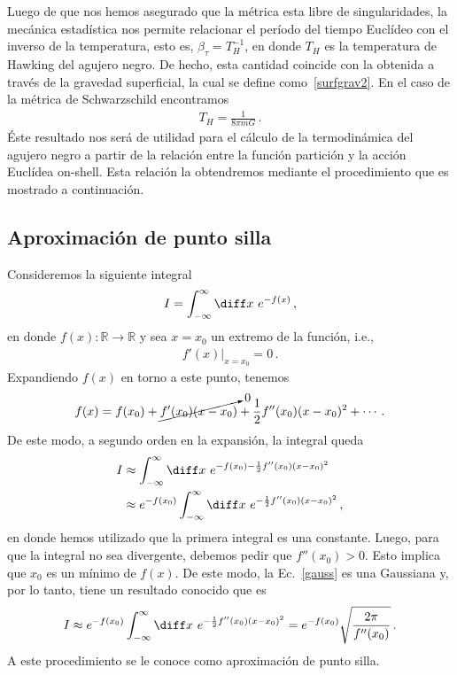 \documentclass[../Main.tex]{subfiles}
\begin{document}
Luego de que nos hemos asegurado que la métrica esta libre de singularidades, la mecánica estadística nos permite relacionar el período del tiempo Euclídeo con el inverso de la temperatura, esto es, $\beta_{\tau}=T_{H}^{-1}$, en donde $T_H$ es la temperatura de Hawking del agujero negro. De hecho, esta cantidad coincide con la obtenida a través de la gravedad superficial, la cual se define como~\eqref{surfgrav2}.
En el caso de la métrica de Schwarzschild encontramos
\begin{align}
    T_{H}=\frac{1}{8\pi mG} \, .
\end{align}
Éste resultado nos será de utilidad para el cálculo de la termodinámica del agujero negro a partir de la relación entre la función partición y la acción Euclídea on-shell. Esta relación la obtendremos mediante el procedimiento que es mostrado a continuación. 




\subsection{Aproximación de punto silla}
Consideremos la siguiente integral
\begin{align}
    I=\int^{\infty}_{-\infty}\diff x \, \,e^{-f(x)}\, ,
\end{align}
en donde $f(x):\mathbb{R}\to\mathbb{R}$ y sea $x=x_{0}$ un extremo de la función, i.e., 
\begin{align}
    f'(x)\big|_{x=x_{0}}=0\, .
\end{align}
Expandiendo $f(x)$ en torno a este punto, tenemos
\begin{align}
    f(x)=f(x_{0})+\cancelto{0}{f'(x_{0})(x-x_{0})}+\frac{1}{2}f''(x_{0})(x-x_{0})^{2}+\cdots \, .
\end{align}
De este modo, a segundo orden en la expansión, la integral queda
\begin{align}\notag
I&\approx\int^{\infty}_{-\infty}\diff x \, \,e^{-f(x_{0})-\frac{1}{2}f''(x_{0})(x-x_{0})^{2}}\\
&\approx e^{-f(x_{0})}\int^{\infty}_{-\infty}\diff x \, \,e^{-\frac{1}{2}f''(x_{0})(x-x_{0})^{2}} \label{gauss}\, ,
\end{align}
en donde hemos utilizado que la primera integral es una constante. Luego, para que la integral no sea divergente, debemos pedir que $f''(x_{0})>0$. Esto implica que $x_0$ es un mínimo de $f(x)$. De este modo, la Ec.~\eqref{gauss} es una Gaussiana y, por lo tanto, tiene un resultado conocido que es
\begin{align}
    I\approx e^{-f(x_{0})}\int^{\infty}_{-\infty}\diff x \, \,e^{-\frac{1}{2}f''(x_{0})(x-x_{0})^{2}}= e^{-f(x_{0})}\sqrt{\frac{2\pi}{f''(x_{0})}}\, .
\end{align}
A este procedimiento se le conoce como aproximación de punto silla. 
\end{document}
